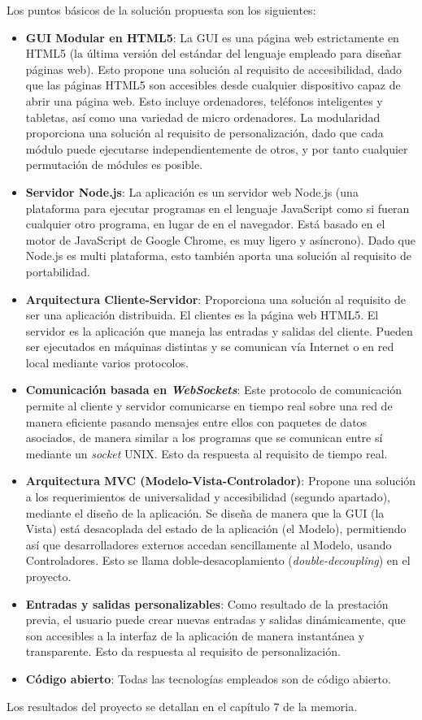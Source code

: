 Los puntos básicos de la solución propuesta son los siguientes:
\begin{itemize}
	\item \textbf{GUI Modular en HTML5}: La GUI es una página web estrictamente en HTML5 (la última versión del estándar del 
	lenguaje empleado para diseñar páginas web). Esto propone una solución al requisito de accesibilidad, dado que las páginas 
	HTML5 son accesibles desde cualquier dispositivo capaz de abrir una página web. Esto incluye ordenadores, teléfonos 
	inteligentes y tabletas, así como una variedad de micro ordenadores. La modularidad proporciona una solución al requisito de 
	personalización, dado que cada módulo puede ejecutarse independientemente de otros, y por tanto cualquier permutación de 
	módules es posible.
	\item \textbf{Servidor Node.js}: La aplicación es un servidor web Node.js (una plataforma para ejecutar programas en el 
	lenguaje JavaScript como si fueran cualquier otro programa, en lugar de en el navegador. Está basado en el motor de 
	JavaScript de Google Chrome, es muy ligero y asíncrono). Dado que Node.js es multi plataforma, esto también aporta una 
	solución al requisito de portabilidad.
	\item \textbf{Arquitectura Cliente-Servidor}: Proporciona una solución al requisito  de ser una aplicación distribuida. El 
	clientes es la página web HTML5. El servidor es la aplicación que maneja las entradas y salidas del cliente. Pueden ser 
	ejecutados en máquinas distintas y se comunican vía Internet o en red local mediante varios protocolos.
	\item \textbf{Comunicación basada en \textit{WebSockets}}: Este protocolo de comunicación permite al cliente y servidor 
	comunicarse en tiempo real sobre una red de manera eficiente pasando mensajes entre ellos con paquetes de datos asociados, de 
	manera similar a los programas que se comunican entre sí mediante un \textit{socket} UNIX. Esto da respuesta al requisito de 
	tiempo real.
	\item \textbf{Arquitectura MVC (Modelo-Vista-Controlador)}: Propone una solución a los requerimientos de universalidad y 
	accesibilidad (segundo apartado), mediante el diseño de la aplicación. Se diseña de manera que la GUI (la Vista) está 
	desacoplada del estado de la aplicación (el Modelo), permitiendo así que desarrolladores externos accedan sencillamente al 
	Modelo, usando Controladores. Esto se llama doble-desacoplamiento (\textit{double-decoupling}) en el proyecto.
	\item \textbf{Entradas y salidas personalizables}: Como resultado de la prestación previa, el usuario puede crear nuevas 
	entradas y salidas dinámicamente, que son accesibles a la interfaz de la aplicación de manera instantánea y transparente. 
	Esto da respuesta al requisito de personalización.
	\item \textbf{Código abierto}: Todas las tecnologías empleados son de código abierto.
\end{itemize}
Los resultados del proyecto se detallan en el capítulo 7 de la memoria.\\


